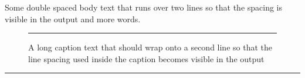 \documentclass{article}
\begin{document}
Some double spaced body text that runs over two lines so that the spacing is visible in the output and more words.
\begin{figure}[htbp]
\centering\rule{3cm}{1cm}
\caption{A long caption text that should wrap onto a second line so that the line spacing used inside the caption becomes visible in the output}\label{fig:a}
\end{figure}
\begin{table}[htbp]
\caption{A table caption with font stretch 1.5 that is also long enough to wrap to a second line in the output}
\centering\rule{3cm}{1cm}
\end{table}
\end{document}
